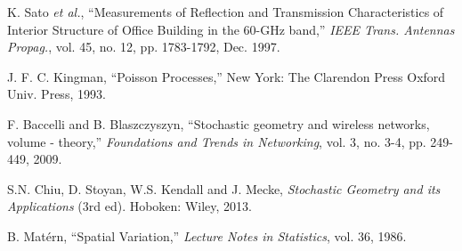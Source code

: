 \documentclass[10pt, conference, letterpaper]{IEEEtran}
\newcommand*{\Rom}[1]{\uppercase\expandafter{\romannumeral #1\relax}} %
\begin{document}
\begin{thebibliography}{50}

K. Sato \emph{et al.}, ``Measurements of Reflection and Transmission Characteristics of Interior Structure of Office Building in the 60-GHz band,'' \emph{IEEE Trans. Antennas Propag.}, vol. 45, no. 12, pp. 1783-1792, Dec. 1997.

J. F. C. Kingman, ``Poisson Processes,'' New York: The Clarendon Press Oxford Univ. Press, 1993.

F. Baccelli and B. Blaszczyszyn, ``Stochastic geometry and wireless networks, volume \Rom{1} - theory,'' \emph{Foundations and Trends in Networking}, vol. 3, no. 3-4, pp. 249-449, 2009.


S.N. Chiu, D. Stoyan, W.S. Kendall and J. Mecke, \emph{Stochastic Geometry and its Applications} (3rd ed). Hoboken: Wiley, 2013. 




B. Mat\'ern, ``Spatial Variation,'' \emph{Lecture Notes in Statistics}, vol. 36, 1986.







\end{thebibliography}
\end{document}
